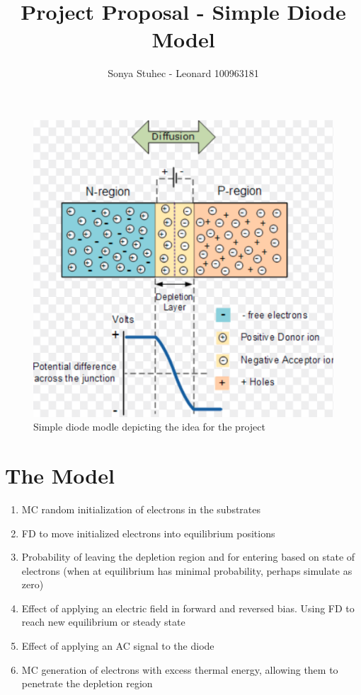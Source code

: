 \documentclass{article}
\begin{document}
\title{Project Proposal -  Simple Diode Model}
\author{Sonya Stuhec - Leonard 100963181}
\maketitle

\begin{figure}[H]
\centering
\includegraphics[scale=0.4]{DiodeModle}
\caption{Simple  diode modle depicting the idea for the project \cite{pic}}
\label{fig:pic}
\end{figure}

\section{The Model}
\begin{enumerate}
\item MC random initialization of electrons in the substrates
\item FD to move initialized electrons into equilibrium positions
\item Probability of leaving the depletion region and for entering based on state of electrons (when at equilibrium has minimal probability, perhaps simulate as zero)
\item Effect of applying an electric field in forward and reversed bias. Using FD to reach new equilibrium or steady state
\item Effect of applying an AC signal to the diode
\item MC generation of electrons with excess thermal energy, allowing them to penetrate the depletion region 
\end{enumerate}
\end{document}
